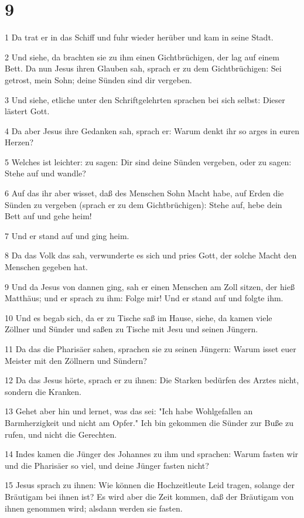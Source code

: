 \chapter{9}

\par 1 Da trat er in das Schiff und fuhr wieder herüber und kam in seine Stadt.
\par 2 Und siehe, da brachten sie zu ihm einen Gichtbrüchigen, der lag auf einem Bett. Da nun Jesus ihren Glauben sah, sprach er zu dem Gichtbrüchigen: Sei getrost, mein Sohn; deine Sünden sind dir vergeben.
\par 3 Und siehe, etliche unter den Schriftgelehrten sprachen bei sich selbst: Dieser lästert Gott.
\par 4 Da aber Jesus ihre Gedanken sah, sprach er: Warum denkt ihr so arges in euren Herzen?
\par 5 Welches ist leichter: zu sagen: Dir sind deine Sünden vergeben, oder zu sagen: Stehe auf und wandle?
\par 6 Auf das ihr aber wisset, daß des Menschen Sohn Macht habe, auf Erden die Sünden zu vergeben (sprach er zu dem Gichtbrüchigen): Stehe auf, hebe dein Bett auf und gehe heim!
\par 7 Und er stand auf und ging heim.
\par 8 Da das Volk das sah, verwunderte es sich und pries Gott, der solche Macht den Menschen gegeben hat.
\par 9 Und da Jesus von dannen ging, sah er einen Menschen am Zoll sitzen, der hieß Matthäus; und er sprach zu ihm: Folge mir! Und er stand auf und folgte ihm.
\par 10 Und es begab sich, da er zu Tische saß im Hause, siehe, da kamen viele Zöllner und Sünder und saßen zu Tische mit Jesu und seinen Jüngern.
\par 11 Da das die Pharisäer sahen, sprachen sie zu seinen Jüngern: Warum isset euer Meister mit den Zöllnern und Sündern?
\par 12 Da das Jesus hörte, sprach er zu ihnen: Die Starken bedürfen des Arztes nicht, sondern die Kranken.
\par 13 Gehet aber hin und lernet, was das sei: "Ich habe Wohlgefallen an Barmherzigkeit und nicht am Opfer." Ich bin gekommen die Sünder zur Buße zu rufen, und nicht die Gerechten.
\par 14 Indes kamen die Jünger des Johannes zu ihm und sprachen: Warum fasten wir und die Pharisäer so viel, und deine Jünger fasten nicht?
\par 15 Jesus sprach zu ihnen: Wie können die Hochzeitleute Leid tragen, solange der Bräutigam bei ihnen ist? Es wird aber die Zeit kommen, daß der Bräutigam von ihnen genommen wird; alsdann werden sie fasten.
